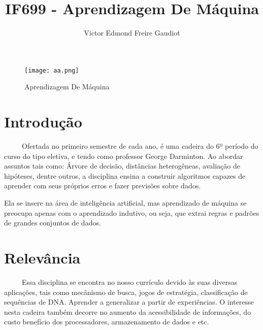 \documentclass[10pt, a4paper]{article}
\title{IF699 - Aprendizagem De Máquina}
\author{Victor Edmond Freire Gaudiot}
\begin{document}
\maketitle

\begin{figure}[h!]
\centering
\texttt{[image: aa.png]}
\caption{Aprendizagem De Máquina}
\label{fig:cérebro de máquina}
\end{figure}


\section{Introdução}
~~~~~Ofertada  no primeiro semestre de cada ano, é uma cadeira do 6º período do curso do tipo eletiva, e tendo como professor George Darminton. Ao abordar assuntos tais como: Árvore de decisão, distâncias heterogêneas, avaliação de hipóteses, dentre outros, \citep{siteDisciplina} a disciplina ensina a construir algoritmos capazes de aprender com seus próprios erros e fazer previsões sobre dados.

Ela se insere na área de inteligência artificial, mas aprendizado de máquina se preocupa apenas com o aprendizado indutivo, ou seja, que extrai regras e padrões de grandes conjuntos de dados.\citep{WikiDisciplina}

\section{Relevância}
~~~~~Essa disciplina se encontra no nosso currículo devido às suas diversas aplicações, tais como mecânismo de busca, jogos de estratégia, classificação de sequências de DNA. Aprender a generalizar a partir de experiências. O interesse nesta cadeira também decorre no aumento da acessibilidade de informações, do custo benefício dos processadores, armazenamento de dados e etc.\citep{Site1}
\end{document}
